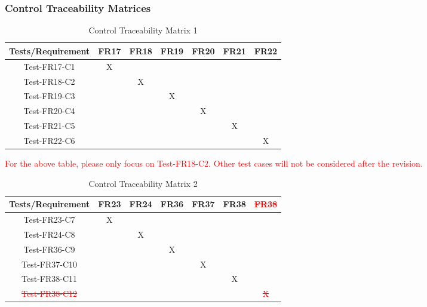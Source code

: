 \documentclass[12pt]{article}
\begin{document}
\subsubsection{Control Traceability Matrices}
\begin{table}[htp]
\centering
\caption{Control Traceability Matrix 1}
\begin{tabular}{|c|c|c|c|c|c|c|}
\hline
Tests/Requirement & FR17 & FR18 & FR19 & FR20 & FR21 & FR22 \\
\hline
Test-FR17-C1      & X    &      &      &      &      &      \\
\hline
Test-FR18-C2      &      & X    &      &      &      &      \\
\hline
Test-FR19-C3      &      &      & X    &      &      &      \\
\hline
Test-FR20-C4      &      &      &      & X    &      &      \\
\hline
Test-FR21-C5      &      &      &      &      & X    &      \\
\hline
Test-FR22-C6      &      &      &      &      &      & X   \\
\hline
\end{tabular}
\end{table}
\noindent \textcolor{red}{For the above table, please only focus on Test-FR18-C2. Other test
cases will not be considered after the revision.}
\begin{table}[htp]
\centering
\caption{Control Traceability Matrix 2}
\begin{tabular}{|c|c|c|c|c|c|c|}
\hline
Tests/Requirement & FR23 & FR24 & FR36 & FR37 & FR38 & \textcolor{red}{\st{FR38}} \\
\hline
Test-FR23-C7      & X    &      &        &      &      &      \\
\hline
Test-FR24-C8      &      & X    &        &      &      &      \\
\hline
Test-FR36-C9    &      &      & X      &      &      &      \\
\hline
Test-FR37-C10     &      &      &        & X    &      &      \\
\hline
Test-FR38-C11     &      &      &        &      & X    &      \\
\hline
\textcolor{red}{\st{Test-FR38-C12}}     &      &      &        &      &      & \textcolor{red}{\st{X}}   \\
\hline
\end{tabular}
\end{table}
\newpage
\end{document}

